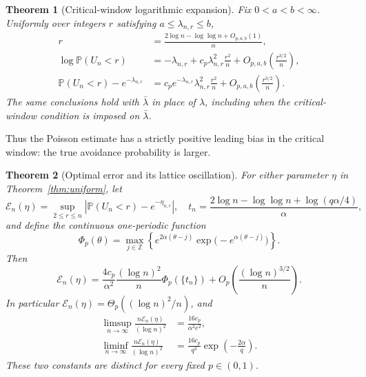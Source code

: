 \documentclass[11pt]{article}
\newtheorem{theorem}{Theorem}[section]
\theoremstyle{definition}\newtheorem{definition}[theorem]{Definition}
\theoremstyle{remark}\newtheorem{remark}[theorem]{Remark}
\newcommand{\PP}{\mathbb P}
\newcommand{\la}{\lambda}
\begin{document}
\begin{theorem}[Critical-window logarithmic expansion]\label{thm:critical}
Fix $0<a<b<\infty$. Uniformly over integers $r$ satisfying
$a\le\la_{n,r}\le b$,
\begin{align}
 r&=\frac{2\log n-\log\log n+O_{p,a,b}(1)}{\alpha},\label{eq:criticalr}\\
 \log\PP(U_n<r)
 &=-\la_{n,r}+c_p\la_{n,r}^2\frac{r^2}{n}
       +O_{p,a,b}\!\left(\frac{r^{3/2}}n\right),\label{eq:criticallog}\\
 \PP(U_n<r)-e^{-\la_{n,r}}
 &=c_p e^{-\la_{n,r}}\la_{n,r}^2\frac{r^2}{n}
       +O_{p,a,b}\!\left(\frac{r^{3/2}}n\right).\label{eq:criticalprob}
\end{align}
The same conclusions hold with $\bar\la$ in place of $\la$, including
when the critical-window condition is imposed on $\bar\la$.
\end{theorem}
Thus the Poisson estimate has a strictly positive leading bias in the
critical window: the true avoidance probability is larger.

\begin{theorem}[Optimal error and its lattice oscillation]\label{thm:lattice}
For either parameter $\eta$ in Theorem~\ref{thm:uniform}, let
\[
 \mathcal E_n(\eta)=\sup_{2\le r\le n}
       |\PP(U_n<r)-e^{-\eta_{n,r}}|,
 \quad
 t_n=\frac{2\log n-\log\log n+\log(q\alpha/4)}{\alpha},
\]
and define the continuous one-periodic function
\begin{equation}
 \Phi_p(\theta)=\max_{j\in\mathbb Z}
 \left\{e^{2\alpha(\theta-j)}
              \exp\bigl(-e^{\alpha(\theta-j)}\bigr)\right\}.
 \label{eq:Phi}
\end{equation}
Then
\begin{equation}
 \mathcal E_n(\eta)=\frac{4c_p}{\alpha^2}\frac{(\log n)^2}{n}
              \Phi_p(\{t_n\})
       +O_p\!\left(\frac{(\log n)^{3/2}}n\right).
 \label{eq:latticeerror}
\end{equation}
In particular $\mathcal E_n(\eta)=\Theta_p((\log n)^2/n)$, and
\begin{align}
 \limsup_{n\to\infty}\frac{n\mathcal E_n(\eta)}{(\log n)^2}
   &=\frac{16c_p}{\alpha^2e^2},\label{eq:limsup}\\
 \liminf_{n\to\infty}\frac{n\mathcal E_n(\eta)}{(\log n)^2}
   &=\frac{16c_p}{q^2}\exp\left(-\frac{2\alpha}{q}\right).
   \label{eq:liminf}
\end{align}
These two constants are distinct for every fixed $p\in(0,1)$.
\end{theorem}
\end{document}
